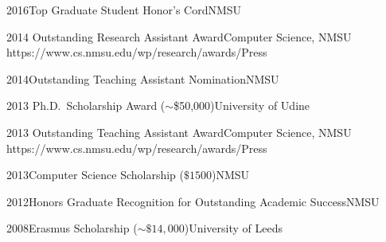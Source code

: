 \begin{awards}
\awardentryN
{2016}{Top Graduate Student Honor's Cord}{NMSU}

\awardentry
	{2014}
	{Outstanding Research Assistant Award}{Computer Science, NMSU}
	{https://www.cs.nmsu.edu/wp/research/awards/}{Press}

\awardentryN
	{2014}{Outstanding Teaching Assistant Nomination}{NMSU}

\awardentryN
	{2013}
	{Ph.D.~Scholarship Award ($\sim$\$50,000)}{University of Udine}

\awardentry 
   {2013}
   {Outstanding Teaching Assistant Award}{Computer Science, NMSU}
   {https://www.cs.nmsu.edu/wp/research/awards/}{Press}

\awardentryN
{2013}{Computer Science Scholarship ($\$ 1500$)}{NMSU}

\awardentryN
{2012}{Honors Graduate Recognition for Outstanding Academic Success}{NMSU}

\awardentryN
{2008}{Erasmus Scholarship ($\sim \$ 14,000$)}{University of Leeds}

\end{awards}

